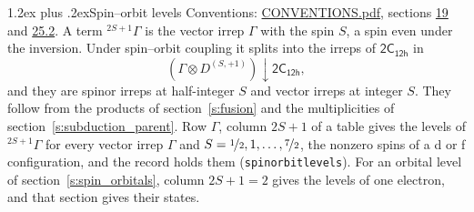 \documentclass[10pt,a4paper]{article}
\makeatletter
\renewcommand\section{\@startsection{section}{1}{\z@}{-3ex plus -1ex minus -.2ex}%
  {1.2ex plus .2ex}{\normalfont\large\sffamily\bfseries\color{parttitle}}}
\numberwithin{equation}{section}
\newcommand{\grp}[1]{\mathsf{#1}}
\newcommand{\restr}[2]{#1\!\downarrow#2}
\newcommand{\irrJp}[2]{D^{(#1,#2)}}
\newcommand{\irrprod}{\otimes}
\newcommand{\term}[2]{{}^{#1}#2}
\makeatother
\begin{document}
\section{Spin--orbit levels}\label{s:spin_orbit}
Conventions: \href{../../CONVENTIONS.pdf}{CONVENTIONS.pdf}, sections \href{../../../rotation/CONVENTIONS.pdf\#conv.19}{19} and \href{../../CONVENTIONS.pdf\#conv.25.2}{25.2}.
\leavevmode\label{n:local.spin}\label{n:symbol.term}A term $\term{2S+1}{\Gamma}$ is the vector irrep $\Gamma$ with the spin $S$, a spin even under the inversion. Under spin--orbit coupling it splits into the irreps of $\grp{2C_{12h}}$ in
\begin{equation}\label{e:spinorbit}\restr{(\Gamma \irrprod \irrJp{S}{+1})}{\grp{2C_{12h}}},\end{equation}
and they are spinor irreps at half-integer $S$ and vector irreps at integer $S$. They follow from the products of section~\ref{s:fusion} and the multiplicities of section~\ref{s:subduction_parent}. Row $\Gamma$, column $2S + 1$ of a table gives the levels of $\term{2S+1}{\Gamma}$ for every vector irrep $\Gamma$ and $S = \nicefrac{1}{2}, 1, \dots, \nicefrac{7}{2}$, the nonzero spins of a d or f configuration, and the record holds them (\texttt{spinorbitlevels}). For an orbital level of section~\ref{s:spin_orbitals}, column $2S + 1 = 2$ gives the levels of one electron, and that section gives their states.
\end{document}
